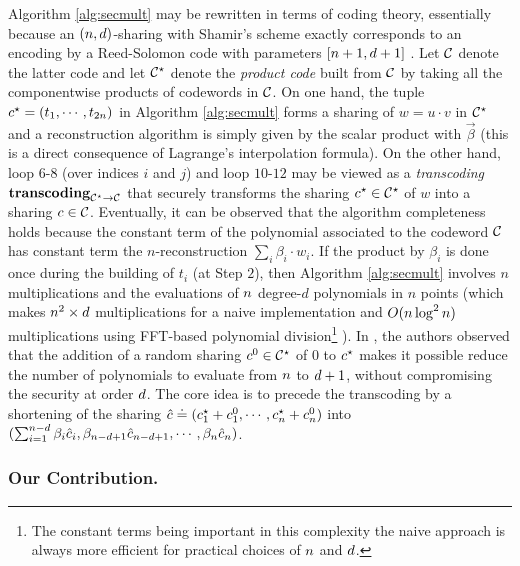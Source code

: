 \documentclass{llncs}
\begin{document}
Algorithm \ref{alg:secmult} may be rewritten in terms of coding theory, essentially because an $(n,d)$-sharing with Shamir's scheme exactly corresponds to an encoding by a Reed-Solomon code with parameters $[n+1,d+1]$ \cite{MS81}. Let $\mathcal{C}$ denote the latter code and let $\mathcal{C}^{\star}$ denote the {\em product code} built from $\mathcal{C}$ by taking all the componentwise products of codewords in $\mathcal{C}$. On one hand, the tuple $c^{\star} = (t_1,\cdots,t_{2n})$ in Algorithm \ref{alg:secmult} forms a sharing of $w=u\cdot v$ in $\mathcal{C}^{\star}$ and a reconstruction algorithm is simply given by the scalar product with $\vec \beta$ (this is a direct consequence of Lagrange's interpolation formula). On the other hand, loop $6$-$8$ (over indices $i$ and $j$) and loop $10$-$12$ may be viewed as a {\em transcoding} $\mathrm{\bf transcoding}_{\mathcal{C}^{\star} \rightarrow \mathcal{C}}$ that securely transforms the sharing $c^{\star}\in \mathcal{C}^{\star}$ of $w$  into a sharing $c \in \mathcal{C}$. Eventually, it can be observed that the algorithm completeness holds because the constant term of the polynomial associated to the codeword $\mathcal{C}$ has constant term the $n$-reconstruction $\sum_i \beta_i\cdot w_i$. If the product by $\beta_i$ is done once during the building of $t_i$ (at Step $2$), then Algorithm \ref{alg:secmult} involves $n$ multiplications and the evaluations of $n$ degree-$d$ polynomials in $n$ points (which makes $n^2\times d$ multiplications for a naive implementation and $O(n \log^2 n)$ multiplications using FFT-based polynomial division\footnote{The constant terms being important in this complexity the naive approach is always more efficient for practical choices of $n$ and $d$.} \cite{CPR12}). In \cite{CRZ13}, the authors observed that the addition of a random sharing $c^{0}\in \mathcal{C}^{\star}$ of $0$ to $c^{\star}$ makes it possible reduce the number of polynomials to evaluate from $n$ to $d+1$, without compromising the security at order $d$. The core idea is to precede the transcoding by a shortening of the sharing $\hat{c} \doteq (c^{\star}_1 + c^{0}_1,\cdots,c^{\star}_{n} + c^{0}_{n} )$ into $(\sum_{i=1}^{n - d}\beta_i \hat{c}_i,\beta_{n -d+1}\hat{c}_{n -d+1},\cdots,\beta_{n}\hat{c}_{n})$.

\subsubsection{Our Contribution.}
 \todo{}
\end{document}
